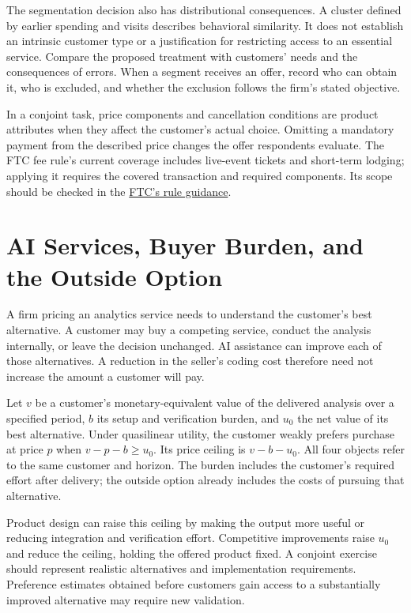 The segmentation decision also has distributional consequences. A
cluster defined by earlier spending and visits describes behavioral
similarity. It does not establish an intrinsic customer type or a
justification for restricting access to an essential service. Compare
the proposed treatment with customers' needs and the consequences of
errors. When a segment receives an offer, record who can obtain it, who
is excluded, and whether the exclusion follows the firm's stated
objective.

In a conjoint task, price components and cancellation conditions are
product attributes when they affect the customer's actual choice.
Omitting a mandatory payment from the described price changes the offer
respondents evaluate. The FTC fee rule's current coverage includes
live-event tickets and short-term lodging; applying it requires the
covered transaction and required components. Its scope should be checked
in the
\href{https://www.ftc.gov/business-guidance/resources/rule-unfair-or-deceptive-fees-frequently-asked-questions}{FTC's
rule guidance}.

\hypertarget{M04-ai-services-buyer-burden-and-the-outside-option}{%
\section{AI Services, Buyer Burden, and the Outside
Option}\label{M04-ai-services-buyer-burden-and-the-outside-option}}

\noindent \noindent A firm pricing an analytics service needs to understand the
customer's best alternative. A customer may buy a competing service,
conduct the analysis internally, or leave the decision unchanged. AI
assistance can improve each of those alternatives. A reduction in the
seller's coding cost therefore need not increase the amount a customer
will pay.

Let \(v\) be a customer's monetary-equivalent value of the delivered
analysis over a specified period, \(b\) its setup and verification
burden, and \(u_0\) the net value of its best alternative. Under
quasilinear utility, the customer weakly prefers purchase at price \(p\)
when \(v-p-b\geq u_0\). Its price ceiling is \(v-b-u_0\). All four
objects refer to the same customer and horizon. The burden includes the
customer's required effort after delivery; the outside option already
includes the costs of pursuing that alternative.

Product design can raise this ceiling by making the output more useful
or reducing integration and verification effort. Competitive
improvements raise \(u_0\) and reduce the ceiling, holding the offered
product fixed. A conjoint exercise should represent realistic
alternatives and implementation requirements. Preference estimates
obtained before customers gain access to a substantially improved
alternative may require new validation.

